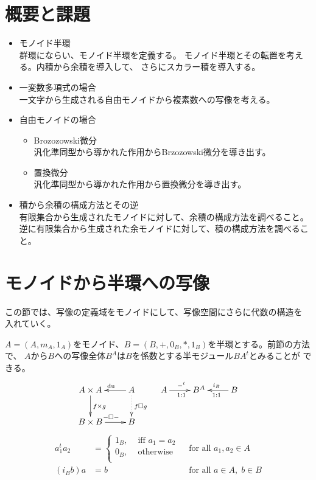 \section{概要と課題}\label{s1:概要と課題} %
	\begin{itemize}
		\item モノイド半環\\
		群環にならい、モノイド半環を定義する。
		モノイド半環とその転置を考える。内積から余積を導入して、
		さらにスカラー積を導入する。
		\item 一変数多項式の場合 \\
		一文字から生成される自由モノイドから複素数への写像を考える。
		\item 自由モノイドの場合
		\begin{itemize}
			\item Brozozowski微分\\
			汎化準同型から導かれた作用からBrzozowski微分を導き出す。
			\item 置換微分\\
			汎化準同型から導かれた作用から置換微分を導き出す。
		\end{itemize}
		\item 積から余積の構成方法とその逆 \\
		有限集合から生成されたモノイドに対して、余積の構成方法を調べること。
		逆に有限集合から生成された余モノイドに対して、積の構成方法を調べること。
	\end{itemize}

\section{モノイドから半環への写像}\label{s1:モノイドから半環への写像} %
	この節では、写像の定義域をモノイドにして、写像空間にさらに代数の構造を
	入れていく。

	$A=(A,m_A,1_A)$をモノイド、$B=(B,+,0_B,*,1_B)$を半環とする。前節の方法で、
	$A$から$B$への写像全体$B^A$は$B$を係数とする半モジュール$BA^t$とみることが
	できる。
	\begin{equation*}\xymatrix{
		A\times A \ar[d]^{f\times g} & A \ar@{.>}[d]^{f\square g} \ar[l]_{\mydu} \\
		B\times B \ar[r]^{-\square-} & B  \\
	}\quad \xymatrix {
		A \ar[r]^{-^t}_{1:1} & B^A & B \ar[l]_{i_B}^{1:1} \\
	}\end{equation*}
	\begin{equation*}\begin{array}{rll} %
		a_1^t a_2 &= \begin{cases}
			1_B, &\text{ iff } a_1=a_2 \\
			0_B, &\text{ otherwise } \\
		\end{cases} &\text{ for all }a_1,a_2\in A \\
		(i_B b) a &= b &\text{ for all }a\in A,\;b\in B \\
	\end{array}\end{equation*} %

